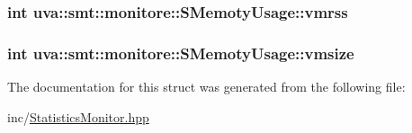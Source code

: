\subsubsection[{vmrss}]{\setlength{\rightskip}{0pt plus 5cm}int uva\+::smt\+::monitore\+::\+S\+Memoty\+Usage\+::vmrss}\label{structuva_1_1smt_1_1monitore_1_1_s_memoty_usage_af2b92553ae06f9b632942a23c20b9fee}
\hypertarget{structuva_1_1smt_1_1monitore_1_1_s_memoty_usage_a4f9b4e9f1c158f9d2889689769579412}{}
\subsubsection[{vmsize}]{\setlength{\rightskip}{0pt plus 5cm}int uva\+::smt\+::monitore\+::\+S\+Memoty\+Usage\+::vmsize}\label{structuva_1_1smt_1_1monitore_1_1_s_memoty_usage_a4f9b4e9f1c158f9d2889689769579412}


The documentation for this struct was generated from the following file\+:\begin{DoxyCompactItemize}
\item 
inc/\hyperlink{_statistics_monitor_8hpp}{Statistics\+Monitor.\+hpp}\end{DoxyCompactItemize}
